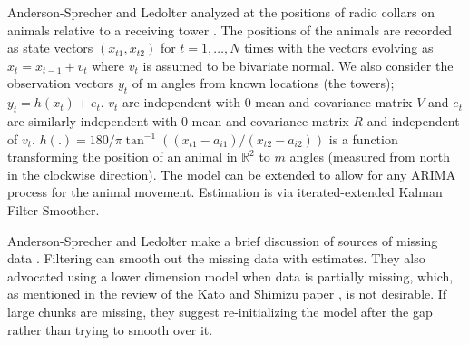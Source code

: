 

Anderson-Sprecher and Ledolter analyzed at the positions of radio collars on animals relative to a receiving tower \cite{anderson-sprecher_state-space_2021}. The positions of the animals are recorded as state vectors $(x_{t1}, x_{t2})$ for $t = 1,…,N$ times with the vectors evolving as $x_t = x_{t-1} + v_t$ where $v_t$ is assumed to be bivariate normal. We also consider the observation vectors $y_t$ of m angles from known locations (the towers); $y_t = h(x_t) + e_t$. $v_t$ are independent with 0 mean and covariance matrix $V$ and $e_t$ are similarly independent with 0 mean and covariance matrix $R$ and independent of $v_t$. $h(.)=180/\pi  \tan^{-1}((x_{t1} - a_{i1})/(x_{t2} - a_{i2}))$ is a function transforming the position of an animal in $\mathbb{R}^2$ to $m$ angles (measured from north in the clockwise direction). The model can be extended to allow for any ARIMA process for the animal movement. Estimation is via iterated-extended Kalman Filter-Smoother.    

Anderson-Sprecher and Ledolter make a brief discussion of sources of missing data \cite{anderson-sprecher_state-space_2021}. Filtering can smooth out the missing data with estimates. They also advocated using a lower dimension model when data is partially missing, which, as mentioned in the review of the Kato and Shimizu paper \cite{kato_dependent_2008}, is not desirable. If large chunks are missing, they suggest re-initializing the model after the gap rather than trying to smooth over it. 



